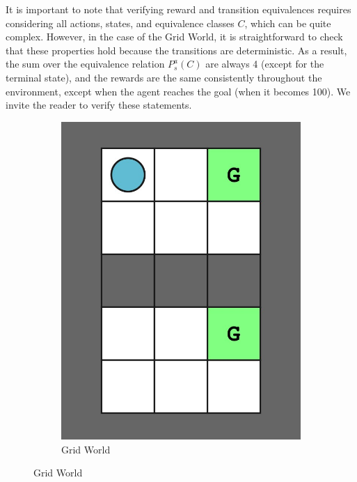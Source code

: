 It is important to note that verifying reward and transition equivalences requires considering all actions, states, and equivalence classes $C$, which can be quite complex. However, in the case of the Grid World, it is straightforward to check that these properties hold because the transitions are deterministic. As a result, the sum over the equivalence relation $P_s^a(C)$ are always 4 (except for the terminal state), and the rewards are the same consistently throughout the environment, except when the agent reaches the goal (when it becomes 100). We invite the reader to verify these statements.

\begin{figure}[h]
    \centering
    \hspace*{\fill}
    \begin{subfigure}{0.3\textwidth}
    \includegraphics[width=\linewidth]{Figures/grid world.jpg}
        \caption{Grid World}
        \label{fig:grid_world}
    \end{subfigure}

\end{figure}
